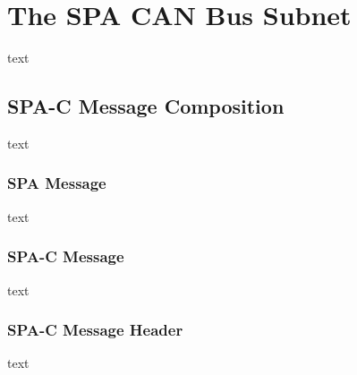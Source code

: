 \section{The SPA CAN Bus Subnet}\label{ch:spa_can_bus_subnet}
text
\subsection{SPA-C Message Composition}
text
\subsubsection{SPA Message}
text
\subsubsection{SPA-C Message}
text
\subsubsection{SPA-C Message Header}
text
